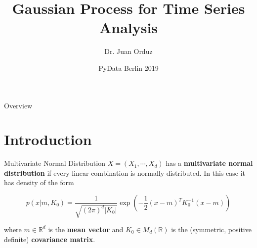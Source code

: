 \documentclass[10pt]{beamer}
\title[Gaussian Process for Time Series Analysis] %
{Gaussian Process for Time Series Analysis}
\author[Dr. Juan Orduz] %
{Dr. Juan Orduz}
\institute[PyData Berlin 2018] %
{

}
\date[ PyData Berlin 2018] %
{ PyData Berlin 2019}
\begin{document}
\begin{frame}
  \titlepage
\end{frame}


\begin{frame}{Overview}
\tableofcontents
\end{frame}

\section{Introduction}

\begin{frame}{Multivariate Normal Distribution}{\cite{multivariate_normal_orduz_2019}}
$X = (X_1, \cdots, X_d)$ has a{ \bf multivariate normal distribution} if every linear combination is normally distributed. In this case it has density of the form

$$
p(x|m,K_0) =\frac{1}{\sqrt{(2\pi)^{d}|K_0|}}\exp\left(-\frac{1}{2}(x - m)^T K_0^{-1}(x - m)\right)
$$

where $m \in \mathbb{R}^d$ is the {\bf mean vector} and  $K_0 \in M_d(\mathbb{R})$ is the (symmetric, positive definite) {\bf covariance matrix}.


\end{frame}
\end{document}
